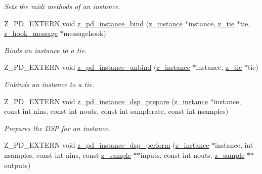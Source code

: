 \begin{DoxyCompactItemize}
\begin{DoxyCompactList}\small\item\em Sets the midi methods of an instance. \end{DoxyCompactList}\item 
\hypertarget{group__zpd_ga33e959e2e0586f50cebb636868f63025}{Z\-\_\-\-P\-D\-\_\-\-E\-X\-T\-E\-R\-N void \hyperlink{group__zpd_ga33e959e2e0586f50cebb636868f63025}{z\-\_\-pd\-\_\-instance\-\_\-bind} (\hyperlink{struct__instance}{z\-\_\-instance} $\ast$instance, \hyperlink{group__zpd_ga36a59f7502bf6b62bab3e65cc08fe08d}{z\-\_\-tie} $\ast$tie, \hyperlink{group__zpd_gad4b95d7399db12ebfe985f7a70a7a6a2}{z\-\_\-hook\-\_\-message} $\ast$messagehook)}\label{group__zpd_ga33e959e2e0586f50cebb636868f63025}

\begin{DoxyCompactList}\small\item\em Binds an instance to a tie. \end{DoxyCompactList}\item 
\hypertarget{group__zpd_gaaed3ce5cd899a6831027b62515850c8f}{Z\-\_\-\-P\-D\-\_\-\-E\-X\-T\-E\-R\-N void \hyperlink{group__zpd_gaaed3ce5cd899a6831027b62515850c8f}{z\-\_\-pd\-\_\-instance\-\_\-unbind} (\hyperlink{struct__instance}{z\-\_\-instance} $\ast$instance, \hyperlink{group__zpd_ga36a59f7502bf6b62bab3e65cc08fe08d}{z\-\_\-tie} $\ast$tie)}\label{group__zpd_gaaed3ce5cd899a6831027b62515850c8f}

\begin{DoxyCompactList}\small\item\em Unbinds an instance to a tie. \end{DoxyCompactList}\item 
\hypertarget{group__zpd_ga559f4d92d27c39402b97664f34b3c6dc}{Z\-\_\-\-P\-D\-\_\-\-E\-X\-T\-E\-R\-N void \hyperlink{group__zpd_ga559f4d92d27c39402b97664f34b3c6dc}{z\-\_\-pd\-\_\-instance\-\_\-dsp\-\_\-prepare} (\hyperlink{struct__instance}{z\-\_\-instance} $\ast$instance, const int nins, const int nouts, const int samplerate, const int nsamples)}\label{group__zpd_ga559f4d92d27c39402b97664f34b3c6dc}

\begin{DoxyCompactList}\small\item\em Prepares the D\-S\-P for an instance. \end{DoxyCompactList}\item 
\hypertarget{group__zpd_ga7b1a78ad8d77b5044c2dea186dfadacd}{Z\-\_\-\-P\-D\-\_\-\-E\-X\-T\-E\-R\-N void \hyperlink{group__zpd_ga7b1a78ad8d77b5044c2dea186dfadacd}{z\-\_\-pd\-\_\-instance\-\_\-dsp\-\_\-perform} (\hyperlink{struct__instance}{z\-\_\-instance} $\ast$instance, int nsamples, const int nins, const \hyperlink{group__zpd_gab051b2e32a9e98865a95c0c9d84c50e5}{z\-\_\-sample} $\ast$$\ast$inputs, const int nouts, \hyperlink{group__zpd_gab051b2e32a9e98865a95c0c9d84c50e5}{z\-\_\-sample} $\ast$$\ast$outputs)}\label{group__zpd_ga7b1a78ad8d77b5044c2dea186dfadacd}


\end{DoxyCompactItemize}
